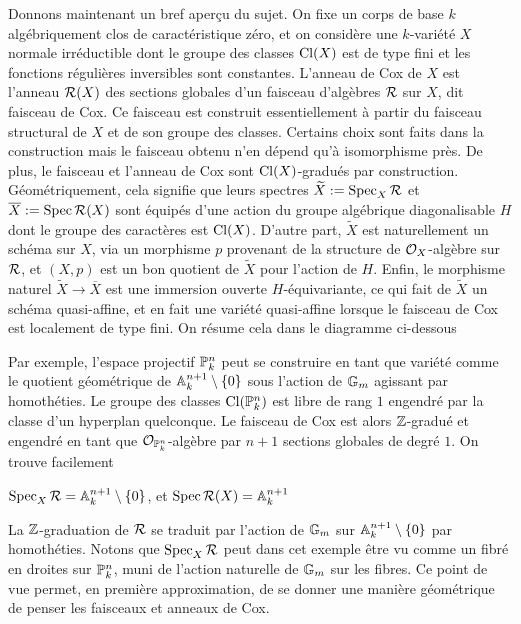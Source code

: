 Donnons maintenant un bref aperçu du sujet. On fixe un corps de base $k$ algébriquement clos de caractéristique zéro, et on considère une $k$-variété $X$ normale irréductible dont le groupe des classes $\operatorname{Cl}(X)$ est de type fini et les fonctions régulières inversibles sont constantes. L'anneau de Cox de $X$ est l'anneau $\mathcal{R}(X)$ des sections globales d'un faisceau d'algèbres $\mathcal{R}$ sur $X$, dit faisceau de Cox. Ce faisceau est construit essentiellement à partir du faisceau structural de $X$ et de son groupe des classes. Certains choix sont faits dans la construction mais le faisceau obtenu n'en dépend qu'à isomorphisme près. De plus, le faisceau et l'anneau de Cox sont $\operatorname{Cl}(X)$-gradués par construction. Géométriquement, cela signifie que leurs spectres $\widetilde{X}:=\operatorname{Spec}_X \mathcal{R}$ et $\overline{X}:=\operatorname{Spec} \mathcal{R}(X)$ sont équipés d'une action du groupe algébrique diagonalisable $H$ dont le groupe des caractères est $\operatorname{Cl}(X)$. D'autre part, $\widetilde{X}$ est naturellement un schéma sur $X$, via un morphisme $p$ provenant de la structure de $\mathcal{O}_X$-algèbre sur $\mathcal{R}$, et $(X, p)$ est un bon quotient de $\widetilde{X}$ pour l'action de $H$. Enfin, le morphisme naturel $\widetilde{X}\rightarrow \overline{X}$ est une immersion ouverte $H$-équivariante, ce qui fait de $\widetilde{X}$ un schéma quasi-affine, et en fait une variété quasi-affine lorsque le faisceau de Cox est localement de type fini. On résume cela dans le diagramme ci-dessous
	\begin{center}
	\end{center}

Par exemple, l'espace projectif $\mathbb{P}_k^n$ peut se construire en tant que variété comme le quotient géométrique de $\mathbb{A}^{n+1}_k\setminus \lbrace 0 \rbrace$ sous l'action de $\mathbb{G}_m$ agissant par homothéties. Le groupe des classes $\operatorname{Cl}(\mathbb{P}_k^n)$ est libre de rang $1$ engendré par la classe d'un hyperplan quelconque. Le faisceau de Cox est alors $\mathbb{Z}$-gradué et engendré en tant que $\mathcal{O}_{\mathbb{P}_k^n}$-algèbre par $n+1$ sections globales de degré $1$. On trouve facilement
\begin{center}
$\operatorname{Spec}_X\mathcal{R}=\mathbb{A}^{n+1}_k\setminus \lbrace 0 \rbrace$, et $\operatorname{Spec} \mathcal{R}(X)=\mathbb{A}^{n+1}_k$
\end{center}
La $\mathbb{Z}$-graduation de $\mathcal{R}$ se traduit par l'action de $\mathbb{G}_m$ sur $\mathbb{A}^{n+1}_k\setminus \lbrace 0 \rbrace$ par homothéties. Notons que $\operatorname{Spec}_X\mathcal{R}$ peut dans cet exemple être vu comme un fibré en droites sur $\mathbb{P}_k^n$, muni de l'action naturelle de $\mathbb{G}_m$ sur les fibres. Ce point de vue permet, en première approximation, de se donner une manière géométrique de penser les faisceaux et anneaux de Cox.

